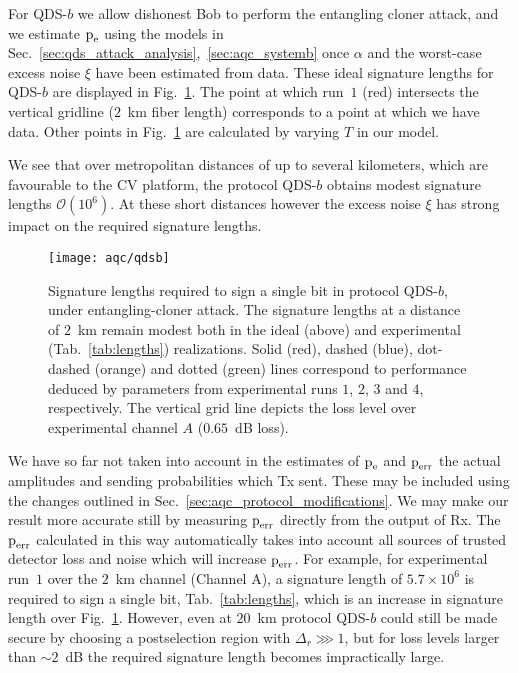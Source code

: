 For QDS-$b$ we allow dishonest Bob to perform the entangling cloner attack, and we estimate $\text{p}_{\text{e}}$ using the models in Sec.~\ref{sec:qds_attack_analysis},~\ref{sec:aqc_systemb} once $\alpha$ and the worst-case excess noise $\xi$ have been estimated from data. These ideal signature lengths for QDS-$b$ are displayed in Fig.~\ref{fig:aqc_qdsb}. The point at which run~$1$ (red) intersects the vertical gridline ($2$~km fiber length) corresponds to a point at which we have data. Other points in Fig.~\ref{fig:aqc_qdsb} are calculated by varying $T$ in our model.

We see that over metropolitan distances of up to several kilometers, which are favourable to the CV platform, the protocol QDS-$b$ obtains modest signature lengths $\mathcal{O}\left(10^6\right)$. At these short distances however the excess noise $\xi$ has strong impact on the required signature lengths.

\begin{figure}[htp]
\captionsetup{width=0.8\linewidth}
\centering
\texttt{[image: aqc/qdsb]}
\caption{\label{fig:aqc_qdsb} Signature lengths required to sign a single bit in protocol QDS-$b$, under entangling-cloner attack. The signature lengths at a distance of $2$~km remain modest both in the ideal (above) and experimental (Tab.~\ref{tab:lengths}) realizations. %
Solid (red), dashed (blue), dot-dashed (orange) and dotted (green) lines correspond to performance deduced by parameters from experimental runs $1$, $2$, $3$ and $4$, respectively. The vertical grid line depicts the loss level over experimental channel $A$ ($0.65$~dB loss).}
\end{figure} %

We have so far not taken into account in the estimates of $\text{p}_{\text{e}}$ and $\text{p}_{\text{err}}$ the actual amplitudes and sending probabilities which Tx sent. These may be included using the changes outlined in Sec.~\ref{sec:aqc_protocol_modifications}. We may make our result more accurate still by measuring $\text{p}_{\text{err}}$ directly from the output of Rx. The $\text{p}_{\text{err}}$ calculated in this way automatically takes into account all sources of trusted detector loss and noise which will increase $\text{p}_{\text{err}}$. For example, for experimental run~$1$ over the $2$~km channel (Channel A), a signature length of $5.7 \times 10^6$ is required to sign a single bit, Tab.~\ref{tab:lengths}, which is an increase in signature length over Fig.~\ref{fig:aqc_qdsb}. However, even at $20$~km protocol QDS-$b$ could still be made secure by choosing a postselection region with $\Delta_r \ggg 1$, but for loss levels larger than $\sim 2$~dB the required signature length becomes impractically large.

